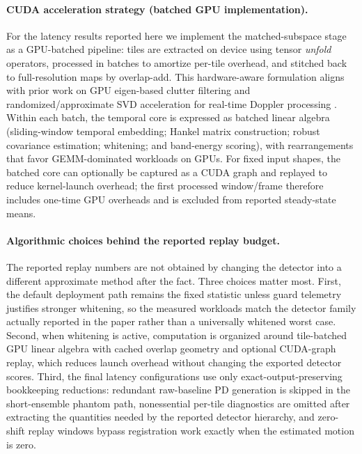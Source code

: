 \documentclass[11pt]{article}
\begin{document}
\paragraph{CUDA acceleration strategy (batched GPU implementation).}
For the latency results reported here we implement the matched-subspace stage as a GPU-batched pipeline: tiles are extracted on device using tensor \emph{unfold} operators, processed in batches to amortize per-tile overhead, and stitched back to full-resolution maps by overlap-add. This hardware-aware formulation aligns with prior work on GPU eigen-based clutter filtering and randomized/approximate SVD acceleration for real-time Doppler processing \cite{CheeGPUEigen2017,LokRandomizedSVD2020}. Within each batch, the temporal core is expressed as batched linear algebra (sliding-window temporal embedding; Hankel matrix construction; robust covariance estimation; whitening; and band-energy scoring), with rearrangements that favor GEMM-dominated workloads on GPUs. For fixed input shapes, the batched core can optionally be captured as a CUDA graph and replayed to reduce kernel-launch overhead; the first processed window/frame therefore includes one-time GPU overheads and is excluded from reported steady-state means.

\paragraph{Algorithmic choices behind the reported replay budget.}
The reported replay numbers are not obtained by changing the detector into a different approximate method after the fact. Three choices matter most. First, the default deployment path remains the fixed statistic unless guard telemetry justifies stronger whitening, so the measured workloads match the detector family actually reported in the paper rather than a universally whitened worst case. Second, when whitening is active, computation is organized around tile-batched GPU linear algebra with cached overlap geometry and optional CUDA-graph replay, which reduces launch overhead without changing the exported detector scores. Third, the final latency configurations use only exact-output-preserving bookkeeping reductions: redundant raw-baseline PD generation is skipped in the short-ensemble phantom path, nonessential per-tile diagnostics are omitted after extracting the quantities needed by the reported detector hierarchy, and zero-shift replay windows bypass registration work exactly when the estimated motion is zero.
\end{document}
